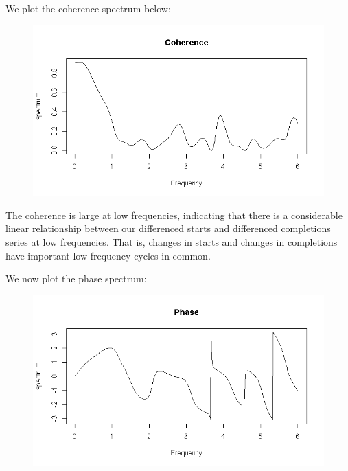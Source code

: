 \documentclass[12pt]{article} %
\begin{document}
We plot the coherence spectrum below:

\begin{figure}[H]
\begin{center}
\includegraphics[scale=0.55]{coherence_spectrum}
\caption{}
\end{center}
\end{figure}

The coherence is large at low frequencies, indicating that there is a considerable linear relationship between our differenced starts and differenced completions series at low frequencies. That is, changes in starts and changes in completions have important low frequency cycles in common.

We now plot the phase spectrum:

\begin{figure}[H]
\begin{center}
\includegraphics[scale=0.55]{phase_spectrum}
\caption{}
\end{center}
\end{figure}
\end{document}
